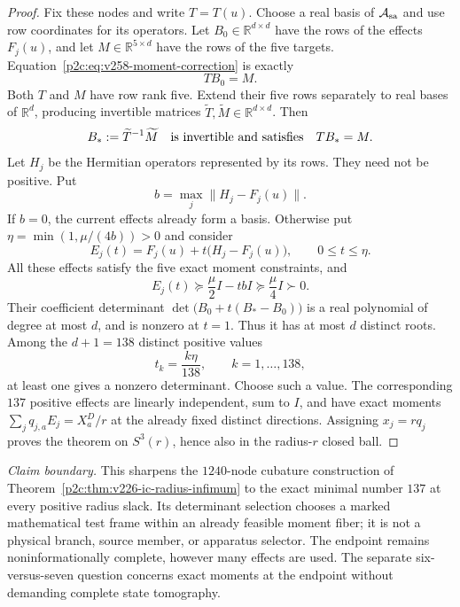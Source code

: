 \documentclass[12pt,a4paper]{article}
\begin{document}
\begin{proof}
Fix these nodes and write $T=T(u)$. Choose a real basis of
$\mathcal A_{\rm sa}$ and use row coordinates for its operators. Let
$B_0\in\mathbb R^{d\times d}$ have the rows of the effects $F_j(u)$,
and let $M\in\mathbb R^{5\times d}$ have the rows of the five targets.
Equation~\eqref{p2c:eq:v258-moment-correction} is exactly
\[
 TB_0=M.
\]
Both $T$ and $M$ have row rank five. Extend their five rows separately
to real bases of $\mathbb R^d$, producing invertible matrices
$\widetilde T,\widetilde M\in\mathbb R^{d\times d}$. Then
\[
 B_*:=\widetilde T^{-1}\widetilde M
 \quad\hbox{is invertible and satisfies}\quad TB_*=M.
\]
Let $H_j$ be the Hermitian operators represented by its rows. They need
not be positive. Put
\[
 b=\max_j\|H_j-F_j(u)\|.
\]
If $b=0$, the current effects already form a basis. Otherwise put
$\eta=\min(1,\mu/(4b))>0$ and consider
\[
 E_j(t)=F_j(u)+t\bigl(H_j-F_j(u)\bigr),\qquad0\le t\le\eta.
\]
All these effects satisfy the five exact moment constraints, and
\[
 E_j(t)\succeq\frac\mu2I-tbI\succeq\frac\mu4I\succ0.
\]
Their coefficient determinant
$\det\bigl(B_0+t(B_*-B_0)\bigr)$ is a real polynomial of degree at most
$d$, and is nonzero at $t=1$. Thus it has at most $d$ distinct roots.
Among the $d+1=138$ distinct positive values
\[
 t_k=\frac{k\eta}{138},\qquad k=1,\ldots,138,
\]
at least one gives a nonzero determinant. Choose such a value. The
corresponding $137$ positive effects are linearly independent, sum to
$I$, and have exact moments $\sum_jq_{j,a}E_j=X_a^D/r$ at the already
fixed distinct directions. Assigning $x_j=rq_j$ proves the theorem on
$S^3(r)$, hence also in the radius-$r$ closed ball.
\end{proof}

\noindent\textit{Claim boundary.}
This sharpens the $1240$-node cubature construction of
Theorem~\ref{p2c:thm:v226-ic-radius-infimum} to the exact minimal number
$137$ at every positive radius slack. Its determinant selection chooses
a marked mathematical test frame within an already feasible moment
fiber; it is not a physical branch, source member, or apparatus selector.
The endpoint remains noninformationally complete, however many effects
are used. The separate six-versus-seven question concerns exact moments
at the endpoint without demanding complete state tomography.
\end{document}

